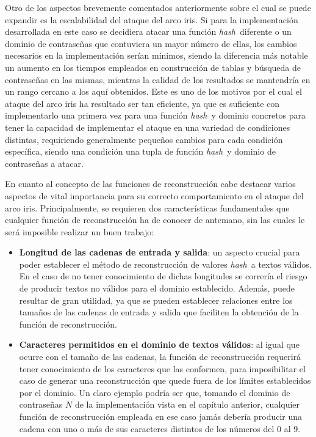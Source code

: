 \documentclass[12pt,spanish,listoffigures,listoftables,listofalgorithms]{tfgetsinf}
\newcommand{\hash}{\textit{hash}}
\begin{document}
Otro de los aspectos brevemente comentados anteriormente sobre el cual se puede expandir es la escalabilidad del ataque del arco iris. Si para la implementación desarrollada en este caso se decidiera atacar una función \hash~diferente o un dominio de contraseñas que contuviera un mayor número de ellas, los cambios necesarios en la implementación serían mínimos, siendo la diferencia más notable un aumento en los tiempos empleados en construcción de tablas y búsqueda de contraseñas en las mismas, mientras la calidad de los resultados se mantendría en un rango cercano a los aquí obtenidos. Este es uno de los motivos por el cual el ataque del arco iris ha resultado ser tan eficiente, ya que es suficiente con implementarlo una primera vez para una función \hash~y dominio concretos para tener la capacidad de implementar el ataque en una variedad de condiciones distintas, requiriendo generalmente pequeños cambios para cada condición específica, siendo una condición una tupla de función \hash~y dominio de contraseñas a atacar.

En cuanto al concepto de las funciones de reconstrucción cabe destacar varios aspectos de vital importancia para su correcto comportamiento en el ataque del arco iris. Principalmente, se requieren dos características fundamentales que cualquier función de reconstrucción ha de conocer de antemano, sin las cuales le será imposible realizar un buen trabajo:

\begin{itemize}

    \item \textbf{Longitud de las cadenas de entrada y salida}: un aspecto crucial para poder establecer el método de reconstrucción de valores \hash~a textos válidos. En el caso de no tener conocimiento de dichas longitudes se correría el riesgo de producir textos no válidos para el dominio establecido. Además, puede resultar de gran utilidad, ya que se pueden establecer relaciones entre los tamaños de las cadenas de entrada y salida que faciliten la obtención de la función de reconstrucción. 
    
    \item \textbf{Caracteres permitidos en el dominio de textos válidos}: al igual que ocurre con el tamaño de las cadenas, la función de reconstrucción requerirá tener conocimiento de los caracteres que las conformen, para imposibilitar el caso de generar una reconstrucción que quede fuera de los límites establecidos por el dominio. Un claro ejemplo podría ser que, tomando el dominio de contraseñas $N$ de la implementación vista en el capítulo anterior, cualquier función de reconstrucción empleada en ese caso jamás debería producir una cadena con uno o más de sus caracteres distintos de los números del 0 al 9.
    
\end{itemize}
\end{document}
